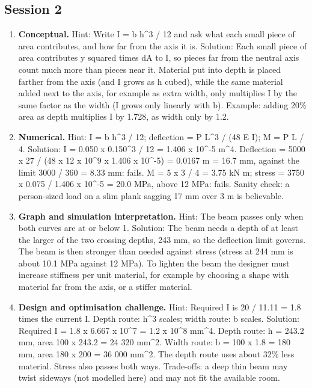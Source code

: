 \documentclass[11pt,a4paper]{article}
\begin{document}
\subsection*{Session 2}
\begin{enumerate}[nosep]
\item \textbf{Conceptual.} Hint: Write I = b h\textasciicircum{}3 / 12 and ask what each small piece of area contributes, and how far from the axis it is. Solution: Each small piece of area contributes y squared times dA to I, so pieces far from the neutral axis count much more than pieces near it. Material put into depth is placed farther from the axis (and I grows as h cubed), while the same material added next to the axis, for example as extra width, only multiplies I by the same factor as the width (I grows only linearly with b). Example: adding 20\% area as depth multiplies I by 1.728, as width only by 1.2.
\item \textbf{Numerical.} Hint: I = b h\textasciicircum{}3 / 12; deflection = P L\textasciicircum{}3 / (48 E I); M = P L / 4. Solution: I = 0.050 x 0.150\textasciicircum{}3 / 12 = 1.406 x 10\textasciicircum{}-5 m\textasciicircum{}4. Deflection = 5000 x 27 / (48 x 12 x 10\textasciicircum{}9 x 1.406 x 10\textasciicircum{}-5) = 0.0167 m = 16.7 mm, against the limit 3000 / 360 = 8.33 mm: fails. M = 5 x 3 / 4 = 3.75 kN m; stress = 3750 x 0.075 / 1.406 x 10\textasciicircum{}-5 = 20.0 MPa, above 12 MPa: fails. Sanity check: a person-sized load on a slim plank sagging 17 mm over 3 m is believable.
\item \textbf{Graph and simulation interpretation.} Hint: The beam passes only when both curves are at or below 1. Solution: The beam needs a depth of at least the larger of the two crossing depths, 243 mm, so the deflection limit governs. The beam is then stronger than needed against stress (stress at 244 mm is about 10.1 MPa against 12 MPa). To lighten the beam the designer must increase stiffness per unit material, for example by choosing a shape with material far from the axis, or a stiffer material.
\item \textbf{Design and optimisation challenge.} Hint: Required I is 20 / 11.11 = 1.8 times the current I. Depth route: h\textasciicircum{}3 scales; width route: b scales. Solution: Required I = 1.8 x 6.667 x 10\textasciicircum{}7 = 1.2 x 10\textasciicircum{}8 mm\textasciicircum{}4. Depth route: h = 243.2 mm, area 100 x 243.2 = 24 320 mm\textasciicircum{}2. Width route: b = 100 x 1.8 = 180 mm, area 180 x 200 = 36 000 mm\textasciicircum{}2. The depth route uses about 32\% less material. Stress also passes both ways. Trade-offs: a deep thin beam may twist sideways (not modelled here) and may not fit the available room.
\end{enumerate}
\end{document}
